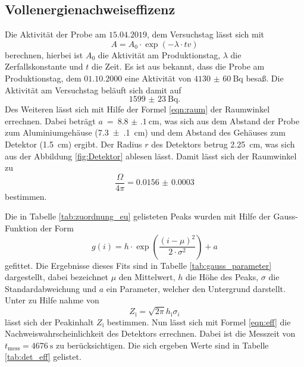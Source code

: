 \subsection{Vollenergienachweiseffizenz}
\label{sec:Vollenergienachweiseffizenz}
Die Aktivität der Probe am $15.04.2019$, dem Versuchstag lässt sich mit
\begin{equation}
  A = A_0 \cdot \exp{\left(-\lambda \cdot tv\right)}
\end{equation}
berechnen, hierbei ist $A_0$ die Aktivität am Produktionstag, $\lambda$ die Zerfallskonstante und $t$ die Zeit.
Es ist aus \cite{V18} bekannt, dass die Probe am Produktionstag, dem
$01.10.2000$ eine Aktivität von $\SI{4130(60)}{\becquerel}$ besaß.
Die Aktivität am Versuchstag beläuft sich damit auf
\begin{equation}
  \SI{1599(23)}{\becquerel}.
\end{equation}
Des Weiteren lässt sich mit Hilfe der Formel \ref{eqn:raum} der Raumwinkel errechnen.
Dabei beträgt $a~=~\SI{8.8(1)}{\centi\meter}$, was sich aus dem Abstand der Probe zum
Aluminiumgehäuse (\SI{7.3(1)}{\centi\meter}) und dem Abstand des Gehäuses zum Detektor 
(\SI{1.5}{\centi\meter}) ergibt. Der Radius $r$ des Detektors betrug \SI{2.25}{\centi\meter}, was sich
aus der Abbildung \ref{fig:Detektor} ablesen lässt. Damit lässt sich der Raumwinkel zu
\begin{equation}
  \frac{\Omega}{4\pi} = \num{0.0156(3)}
\end{equation}
bestimmen.

Die in Tabelle \ref{tab:zuordnung_eu} gelisteten Peaks wurden mit Hilfe der
Gauss-Funktion der Form
\begin{equation}
  g(i) = h \cdot \exp{\left(\frac{\left(i - \mu\right)^2}{2 \cdot \sigma^2}\right)} + a
\end{equation}
gefittet. Die Ergebnisse dieses Fits sind in Tabelle \ref{tab:gauss_parameter}
dargestellt, dabei bezeichnet $\mu$ den Mittelwert, $h$ die Höhe des Peaks, $\sigma$
die Standardabweichung und $a$ ein Parameter, welcher den Untergrund darstellt.
Unter zu Hilfe nahme von
\begin{equation}
  Z_\text{i} = \sqrt{2\pi} h_\text{i} \sigma_{i}
\end{equation}
lässt sich der Peakinhalt $Z_\text{i}$ bestimmen. Nun lässt sich mit Formel \ref{eqn:eff}
die Nachweiswahrscheinlichkeit des Detektors errechnen. Dabei ist die Messzeit von $t_\text{mess} = \SI{4676}{\second}$
zu berücksichtigen. Die sich ergeben Werte sind in Tabelle \ref{tab:det_eff} gelistet.

